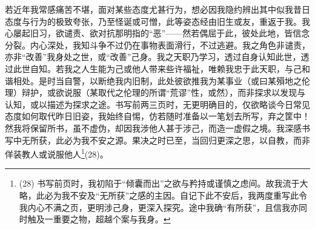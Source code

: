 若近年我常感痛苦不堪，面对某些态度尤甚行为，想必因我隐约辨出其中似我昔日态度与行为的极致夸张，乃至怪诞或可憎，此等姿态经由旧生或友，重返于我。我心屡起旧习，欲谴责、欲对抗那明指的“恶”——然若偶屈于此，彼处此地，皆信念分裂。内心深处，我知斗争不过仍在事物表面滑行，不过逃避。我之角色非谴责，亦非“改善”我身处之世，或“改善”己身。我之天职乃学习，透过自身认知此世，透过此世自知。若我之人生能为己或他人带来些许福祉，唯赖我忠于此天职，与己和谐相处。是时当自警，以断绝我内旧制，此处彼欲推我为某事业（或曰某殞地之伦理）辩护，或欲说服（某取代之伦理的所谓“荒谬”性，或然），而非探求以发现与认知，或以描述为探求之途。书写前两三页时，无更明确目的，仅欲略谈今日常见态度如何取代昨日旧姿，我始终自惕，仿若随时准备以一笔划去所写，弃之筐中！然我将保留所书，虽不虚伪，却因我涉他人甚于涉己，而造一虚假之境。我深感书写中无所获，此必为我不安之源。果决之时已至，当回归更深之思，以自教，而非佯装教人或说服他人\footnote{(28) 书写前页时，我初陷于“倾囊而出”之欲与矜持或谨慎之虑间。故我流于大略，此必为我不安及“无所获”之感的主因。自记下此不安后，我两度重写此令我内心不满之页，更明涉己身，更深入探究。途中我确“有所获”，且信我亦同时触及一重要之物，超越个案与我身。}(28)。